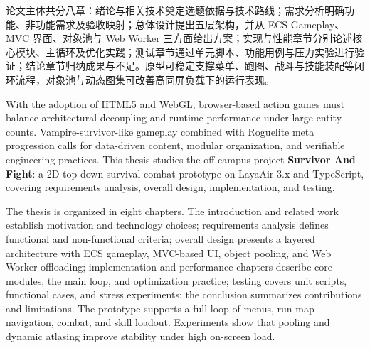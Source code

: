 论文主体共分八章：绪论与相关技术奠定选题依据与技术路线；需求分析明确功能、非功能需求及验收映射；总体设计提出五层架构，并从 ECS Gameplay、MVC 界面、对象池与 Web Worker 三方面给出方案；实现与性能章节分别论述核心模块、主循环及优化实践；测试章节通过单元脚本、功能用例与压力实验进行验证；结论章节归纳成果与不足。原型可稳定支撑菜单、跑图、战斗与技能装配等闭环流程，对象池与动态图集可改善高同屏负载下的运行表现。


\clearpage
\upcabstracten
{}
\setlength{\parindent}{2em}
With the adoption of HTML5 and WebGL, browser-based action games must balance architectural decoupling and runtime performance under large entity counts. Vampire-survivor-like gameplay combined with Roguelite meta progression calls for data-driven content, modular organization, and verifiable engineering practices. This thesis studies the off-campus project \textbf{Survivor And Fight}: a 2D top-down survival combat prototype on LayaAir 3.x and TypeScript, covering requirements analysis, overall design, implementation, and testing.

The thesis is organized in eight chapters. The introduction and related work establish motivation and technology choices; requirements analysis defines functional and non-functional criteria; overall design presents a layered architecture with ECS gameplay, MVC-based UI, object pooling, and Web Worker offloading; implementation and performance chapters describe core modules, the main loop, and optimization practice; testing covers unit scripts, functional cases, and stress experiments; the conclusion summarizes contributions and limitations. The prototype supports a full loop of menus, run-map navigation, combat, and skill loadout. Experiments show that pooling and dynamic atlasing improve stability under high on-screen load.

